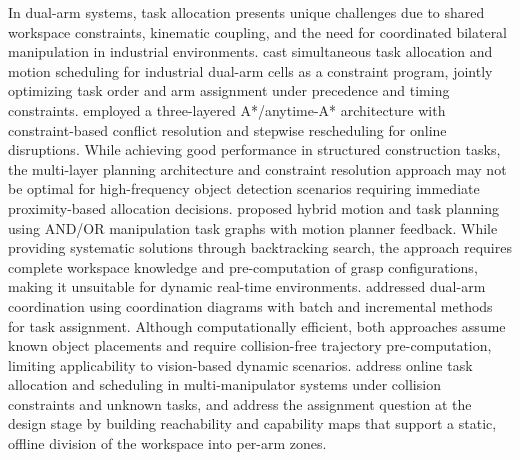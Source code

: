 In dual-arm systems, task allocation presents unique challenges due to shared workspace constraints,
kinematic coupling, and the need for coordinated bilateral manipulation in industrial environments.
\citet{behrens2019constraint} cast simultaneous task allocation and motion scheduling for industrial
dual-arm cells as a constraint program, jointly optimizing task order and arm assignment under
precedence and timing constraints. \citet{hamasaki2023autonomous} employed a three-layered
A*/anytime-A* architecture with constraint-based conflict resolution and stepwise rescheduling for
online disruptions. While achieving good performance in structured construction tasks, the
multi-layer planning architecture and constraint resolution approach may not be optimal for
high-frequency object detection scenarios requiring immediate proximity-based allocation decisions.
\citet{rodriguez2016combining} proposed hybrid motion and task planning using AND/OR manipulation
task graphs with motion planner feedback. While providing systematic solutions through backtracking
search, the approach requires complete workspace knowledge and pre-computation of grasp
configurations, making it unsuitable for dynamic real-time environments.
\citet{kimmel2016scheduling} addressed dual-arm coordination using coordination diagrams with batch
and incremental methods for task assignment. Although computationally efficient, both approaches
assume known object placements and require collision-free trajectory pre-computation, limiting
applicability to vision-based dynamic scenarios.
\citet{qin2024onlinemulti} address online task allocation and scheduling in multi-manipulator
systems under collision constraints and unknown tasks, and \citet{zacharias2007capturing} address
the assignment question at the design stage by building reachability and capability maps that
support a static, offline division of the workspace into per-arm zones.

